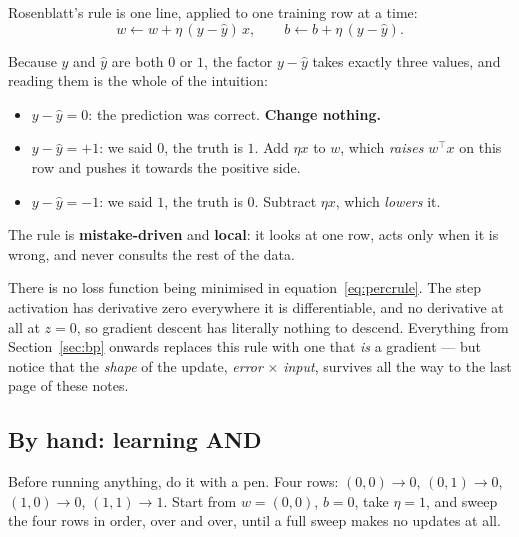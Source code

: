 \documentclass[11pt]{article}
\begin{document}
Rosenblatt's rule is one line, applied to one training row at a time:
\begin{equation}
  w \leftarrow w + \eta\,(y - \hat y)\,x,
  \qquad
  b \leftarrow b + \eta\,(y - \hat y).
  \label{eq:percrule}
\end{equation}

Because $y$ and $\hat y$ are both $0$ or $1$, the factor $y - \hat y$ takes
exactly three values, and reading them is the whole of the intuition:

\begin{itemize}[leftmargin=*]
  \item $y - \hat y = 0$: the prediction was correct. \textbf{Change
    nothing.}
  \item $y - \hat y = +1$: we said $0$, the truth is $1$. Add $\eta x$ to $w$,
    which \emph{raises} $w^\top x$ on this row and pushes it towards the
    positive side.
  \item $y - \hat y = -1$: we said $1$, the truth is $0$. Subtract $\eta x$,
    which \emph{lowers} it.
\end{itemize}

The rule is \textbf{mistake-driven} and \textbf{local}: it looks at one row,
acts only when it is wrong, and never consults the rest of the data.

\begin{caution}
There is no loss function being minimised in equation~\eqref{eq:percrule}. The
step activation has derivative zero everywhere it is differentiable, and no
derivative at all at $z = 0$, so gradient descent has literally nothing to
descend. Everything from Section~\ref{sec:bp} onwards replaces this rule with
one that \emph{is} a gradient --- but notice that the \emph{shape} of the
update, \emph{error} $\times$ \emph{input}, survives all the way to the last
page of these notes.
\end{caution}

\subsection{By hand: learning AND}
\label{sec:and}

Before running anything, do it with a pen. Four rows:
$(0,0)\to 0$, $(0,1)\to 0$, $(1,0)\to 0$, $(1,1)\to 1$. Start from
$w = (0,0)$, $b = 0$, take $\eta = 1$, and sweep the four rows in order, over
and over, until a full sweep makes no updates at all.
\end{document}
